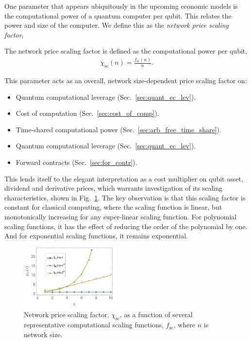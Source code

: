 One parameter that appears ubiquitously in the upcoming economic models is the computational power of a quantum computer per qubit. This relates the power and size of the computer. We define this as the \textit{network price scaling factor},

\begin{definition}\label{def:NPSF}
The network price scaling factor is defined as the computational power per qubit,
\begin{align}
\chi_\text{sc}(n) = \frac{f_\text{sc}(n)}{n}.
\end{align}
\end{definition}

This parameter acts as an overall, network size-dependent price scaling factor on:
\begin{itemize}
\item Quantum computational leverage (Sec.~\ref{sec:quant_ec_lev}).
\item Cost of computation (Sec.~\ref{sec:cost_of_comp}).
\item Time-shared computational power (Sec.~\ref{sec:arb_free_time_share}).
\item Quantum computational leverage (Sec.~\ref{sec:quant_ec_lev}).
\item Forward contracts (Sec.~\ref{sec:for_contr}).
\end{itemize}

This lends itself to the elegant interpretation as a cost multiplier on qubit asset, dividend and derivative prices, which warrants investigation of its scaling characteristics, shown in Fig.~\ref{fig:NPSF}. The key observation is that this scaling factor is constant for classical computing, where the scaling function is linear, but monotonically increasing for any super-linear scaling function. For polynomial scaling functions, it has the effect of reducing the order of the polynomial by one. And for exponential scaling functions, it remains exponential.

\begin{figure}[htb!]
	\includegraphics[width=0.47\textwidth]{network_price_scaling_factor}
	\caption{Network price scaling factor, $\chi_\text{sc}$, as a function of several representative computational scaling functions, $f_\text{sc}$, where $n$ is network size.} \label{fig:NPSF}
\end{figure}

